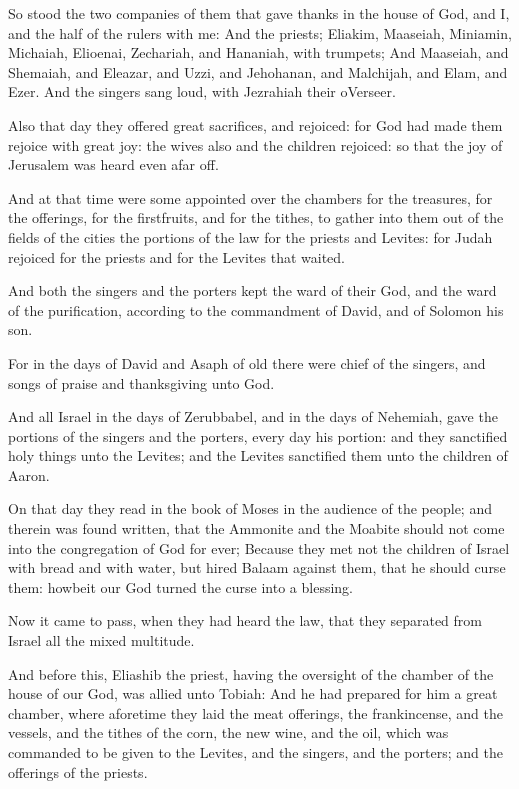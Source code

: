 \Verse So stood the two companies of them that gave thanks in the house of God, and I, and the half of the rulers with me: \Verse And the priests; Eliakim, Maaseiah, Miniamin, Michaiah, Elioenai, Zechariah, and Hananiah, with trumpets; \Verse And Maaseiah, and Shemaiah, and Eleazar, and Uzzi, and Jehohanan, and Malchijah, and Elam, and Ezer.  And the singers sang loud, with Jezrahiah their oVerseer.

\Verse Also that day they offered great sacrifices, and rejoiced: for God had made them rejoice with great joy: the wives also and the children rejoiced: so that the joy of Jerusalem was heard even afar off.

\Verse And at that time were some appointed over the chambers for the treasures, for the offerings, for the firstfruits, and for the tithes, to gather into them out of the fields of the cities the portions of the law for the priests and Levites: for Judah rejoiced for the priests and for the Levites that waited.

\Verse And both the singers and the porters kept the ward of their God, and the ward of the purification, according to the commandment of David, and of Solomon his son.

\Verse For in the days of David and Asaph of old there were chief of the singers, and songs of praise and thanksgiving unto God.

\Verse And all Israel in the days of Zerubbabel, and in the days of Nehemiah, gave the portions of the singers and the porters, every day his portion: and they sanctified holy things unto the Levites; and the Levites sanctified them unto the children of Aaron.


\Chapter
\Verse On that day they read in the book of Moses in the audience of the people; and therein was found written, that the Ammonite and the Moabite should not come into the congregation of God for ever; \Verse Because they met not the children of Israel with bread and with water, but hired Balaam against them, that he should curse them: howbeit our God turned the curse into a blessing.

\Verse Now it came to pass, when they had heard the law, that they separated from Israel all the mixed multitude.

\Verse And before this, Eliashib the priest, having the oversight of the chamber of the house of our God, was allied unto Tobiah: \Verse And he had prepared for him a great chamber, where aforetime they laid the meat offerings, the frankincense, and the vessels, and the tithes of the corn, the new wine, and the oil, which was commanded to be given to the Levites, and the singers, and the porters; and the offerings of the priests.

